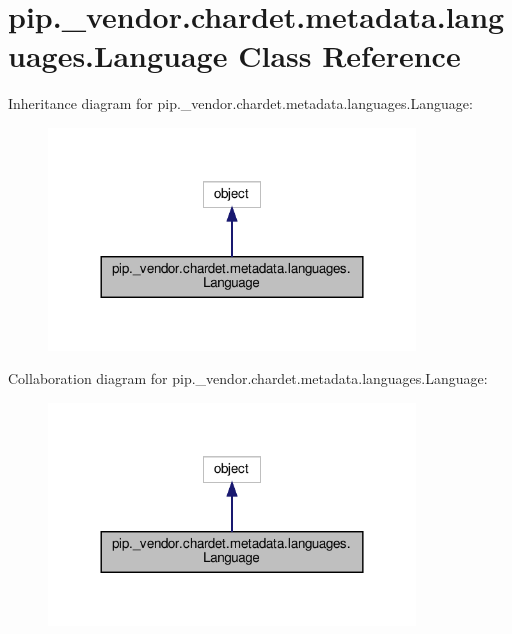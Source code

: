 \hypertarget{classpip_1_1__vendor_1_1chardet_1_1metadata_1_1languages_1_1Language}{}\section{pip.\+\_\+vendor.\+chardet.\+metadata.\+languages.\+Language Class Reference}
\label{classpip_1_1__vendor_1_1chardet_1_1metadata_1_1languages_1_1Language}


Inheritance diagram for pip.\+\_\+vendor.\+chardet.\+metadata.\+languages.\+Language\+:
\nopagebreak
\begin{figure}[H]
\begin{center}
\leavevmode
\includegraphics[width=276pt]{classpip_1_1__vendor_1_1chardet_1_1metadata_1_1languages_1_1Language__inherit__graph}
\end{center}
\end{figure}


Collaboration diagram for pip.\+\_\+vendor.\+chardet.\+metadata.\+languages.\+Language\+:
\nopagebreak
\begin{figure}[H]
\begin{center}
\leavevmode
\includegraphics[width=276pt]{classpip_1_1__vendor_1_1chardet_1_1metadata_1_1languages_1_1Language__coll__graph}
\end{center}
\end{figure}
